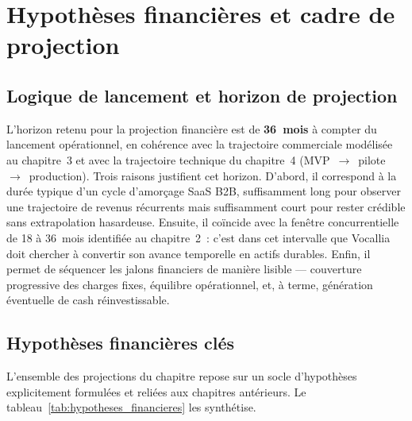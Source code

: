 \section{Hypothèses financières et cadre de projection}
\label{sec:hypotheses_financieres}

\subsection{Logique de lancement et horizon de projection}
\label{subsec:logique_lancement}

L'horizon retenu pour la projection financière est de \textbf{36~mois} à compter du lancement opérationnel, en cohérence avec la trajectoire commerciale modélisée au chapitre~3 et avec la trajectoire technique du chapitre~4 (MVP~$\to$~pilote~$\to$~production). Trois raisons justifient cet horizon. D'abord, il correspond à la durée typique d'un cycle d'amorçage SaaS B2B, suffisamment long pour observer une trajectoire de revenus récurrents mais suffisamment court pour rester crédible sans extrapolation hasardeuse. Ensuite, il coïncide avec la fenêtre concurrentielle de 18 à 36~mois identifiée au chapitre~2~: c'est dans cet intervalle que Vocallia doit chercher à convertir son avance temporelle en actifs durables. Enfin, il permet de séquencer les jalons financiers de manière lisible — couverture progressive des charges fixes, équilibre opérationnel, et, à terme, génération éventuelle de cash réinvestissable.

\subsection{Hypothèses financières clés}
\label{subsec:hypotheses_cles}

L'ensemble des projections du chapitre repose sur un socle d'hypothèses explicitement formulées et reliées aux chapitres antérieurs. Le tableau~\ref{tab:hypotheses_financieres} les synthétise.

